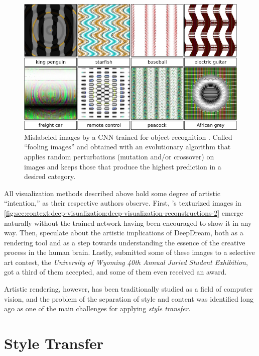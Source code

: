 \begin{figure}[t]
  \includegraphics[width=\textwidth]{gfx/deep-visualization-fooling}
  \caption{
    Mislabeled images by a CNN trained for object recognition \cite{Nguyen2014}.
    Called ``fooling images'' and obtained with an evolutionary algorithm that applies random perturbations (mutation and/or crossover) on images and keeps those that produce the highest prediction in a desired category.
  }
  \label{fig:sec:context:deep-visualization:deep-visualization-fooling}
\end{figure}

All visualization methods described above hold some degree of artistic ``intention,'' as their respective authors observe.
First, \citeauthor{Mahendran2014}'s texturized images in \autoref{fig:sec:context:deep-visualization:deep-visualization-reconstructions-2} emerge naturally without the trained network having been encouraged to show it in any way.
Then, \citeauthor{Mordvintsev2015} speculate about the artistic implications of DeepDream, both as a rendering tool and as a step towards understanding the essence of the creative process in the human brain.
Lastly, \citeauthor{Nguyen2014} submitted some of these images to a selective art contest, the \emph{University of Wyoming 40th Annual Juried Student Exhibition}, got a third of them accepted, and some of them even received an award.

Artistic rendering, however, has been traditionally studied as a field of computer vision, and the problem of the separation of style and content was identified long ago as one of the main challenges for applying \emph{style transfer}.



\section{Style Transfer}
\label{sec:context:style-transfer}

